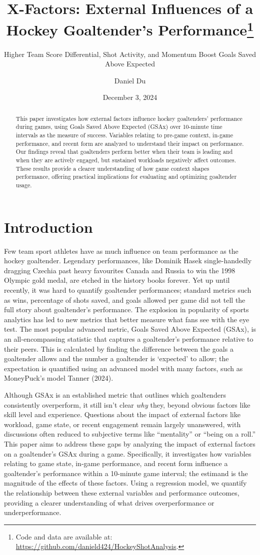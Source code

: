 \documentclass[
  letterpaper,
  DIV=11,
  numbers=noendperiod]{scrartcl}
\title{X-Factors: External Influences of a Hockey Goaltender's
Performance\thanks{Code and data are available at:
\url{https://github.com/danield424/HockeyShotAnalysis}.}}
\subtitle{Higher Team Score Differential, Shot Activity, and Momentum
Boost Goals Saved Above Expected}
\author{Daniel Du}
\date{December 3, 2024}
\begin{document}
\maketitle
\begin{abstract}
This paper investigates how external factors influence hockey
goaltenders' performance during games, using Goals Saved Above Expected
(GSAx) over 10-minute time intervals as the measure of success.
Variables relating to pre-game context, in-game performance, and recent
form are analyzed to understand their impact on performance. Our
findings reveal that goaltenders perform better when their team is
leading and when they are actively engaged, but sustained workloads
negatively affect outcomes. These results provide a clearer
understanding of how game context shapes performance, offering practical
implications for evaluating and optimizing goaltender usage.
\end{abstract}


\section{Introduction}\label{introduction}

Few team sport athletes have as much influence on team performance as
the hockey goaltender. Legendary performances, like Dominik Hasek
single-handedly dragging Czechia past heavy favourites Canada and Russia
to win the 1998 Olympic gold medal, are etched in the history books
forever. Yet up until recently, it was hard to quantify goaltender
performances; standard metrics such as wins, percentage of shots saved,
and goals allowed per game did not tell the full story about
goaltender's performance. The explosion in popularity of sports
analytics has led to new metrics that better measure what fans see with
the eye test. The most popular advanced metric, Goals Saved Above
Expected (GSAx), is an all-encompassing statistic that captures a
goaltender's performance relative to their peers. This is calculated by
finding the difference between the goals a goaltender allows and the
number a goaltender is `expected' to allow; the expectation is
quantified using an advanced model with many factors, such as
MoneyPuck's model Tanner (2024).

Although GSAx is an established metric that outlines which goaltenders
consistently overperform, it still isn't clear \emph{why} they, beyond
obvious factors like skill level and experience. Questions about the
impact of external factors like workload, game state, or recent
engagement remain largely unanswered, with discussions often reduced to
subjective terms like ``mentality'' or ``being on a roll.'' This paper
aims to address these gaps by analyzing the impact of external factors
on a goaltender's GSAx during a game. Specifically, it investigates how
variables relating to game state, in-game performance, and recent form
influence a goaltender's performance within a 10-minute game interval;
the estimand is the magnitude of the effects of these factors. Using a
regression model, we quantify the relationship between these external
variables and performance outcomes, providing a clearer understanding of
what drives overperformance or underperformance.
\end{document}
